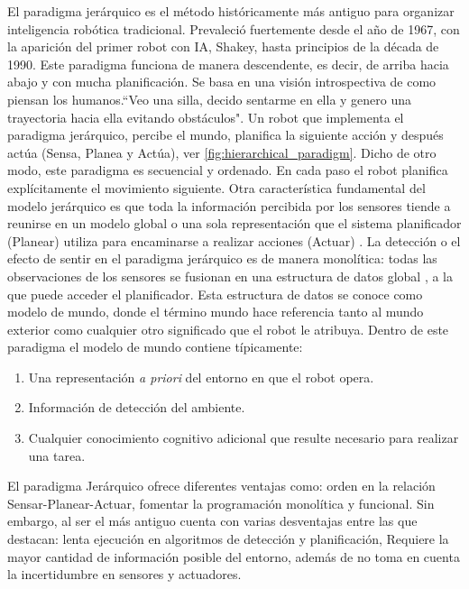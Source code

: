 El paradigma jerárquico es el método históricamente más antiguo para organizar inteligencia robótica tradicional. Prevaleció fuertemente desde el año de 1967, con la aparición del primer robot con IA, Shakey\cite{kuipers2017shakey}, hasta principios de la década de 1990. Este paradigma funciona de manera descendente, es decir, de arriba hacia abajo y con mucha planificación. Se basa en una visión introspectiva de como piensan los humanos.``Veo una silla, decido sentarme en ella y genero una trayectoria hacia ella evitando obstáculos". Un robot que implementa el paradigma jerárquico, percibe el mundo, planifica la siguiente acción y después actúa (Sensa, Planea y Actúa), ver \ref{fig:hierarchical_paradigm}. Dicho de otro modo, este paradigma es secuencial y ordenado. En cada paso el robot planifica explícitamente el movimiento siguiente. Otra característica fundamental del modelo jerárquico es que toda la información percibida por los sensores tiende a reunirse en un modelo global o una sola representación que el sistema planificador (Planear) utiliza para encaminarse a realizar acciones (Actuar) \cite{murphy2019introduction}. 
La detección o el efecto de sentir en el paradigma jerárquico es de manera monolítica: todas las observaciones de los sensores se fusionan en una estructura de datos global , a la que puede acceder el planificador. Esta estructura de datos se conoce como modelo de mundo, donde el término mundo hace referencia tanto al mundo exterior como cualquier otro significado que el robot le atribuya. Dentro de este paradigma el modelo de mundo contiene típicamente:
\begin{enumerate}
    \item Una representación \textit{a priori} del entorno en que el robot opera.
    \item Información de detección del ambiente.
    \item Cualquier conocimiento cognitivo adicional que resulte necesario para realizar una tarea.
\end{enumerate}

El paradigma Jerárquico ofrece diferentes ventajas como: orden en la relación Sensar-Planear-Actuar, fomentar la programación monolítica y funcional. Sin embargo, al ser el más antiguo cuenta con varias desventajas entre las que destacan: lenta ejecución en algoritmos de detección y planificación, Requiere la mayor cantidad de información posible del entorno, además de no toma en cuenta la incertidumbre en sensores y actuadores.


